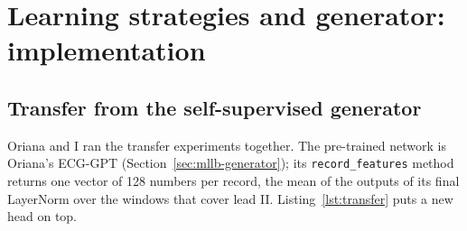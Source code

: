 \section{Learning strategies and generator: implementation}\label{sec:mllb-strategies}

\subsection{Transfer from the self-supervised generator}

Oriana and I ran the transfer experiments together. The pre-trained network is Oriana's ECG-GPT
(Section~\ref{sec:mllb-generator}); its \texttt{record\_features} method returns one vector of 128 numbers
per record, the mean of the outputs of its final LayerNorm over the windows that cover lead II. Listing~\ref{lst:transfer}
puts a new head on top.



